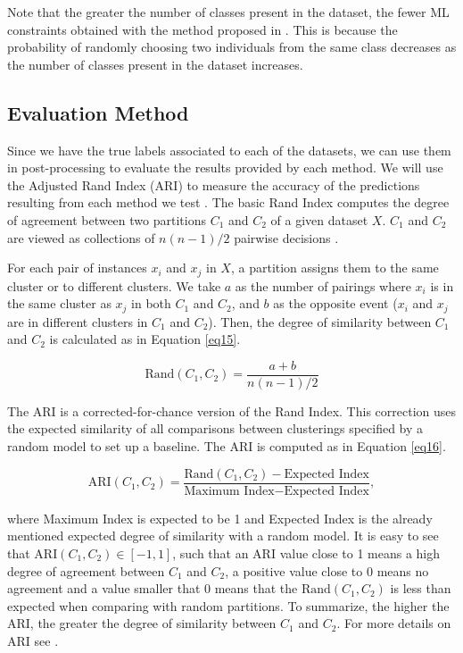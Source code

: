 \documentclass[review]{elsarticle}
\begin{document}
Note that the greater the number of classes present in the dataset, the fewer ML constraints obtained with the method proposed in \cite{wagstaff2001constrained}. This is because the probability of randomly choosing two individuals from the same class decreases as the number of classes present in the dataset increases.

\clearpage

\subsection{Evaluation Method} \label{sec:EvalMet}

Since we have the true labels associated to each of the datasets, we can use them in post-processing to evaluate the results provided by each method. We will use the Adjusted Rand Index (ARI) to measure the accuracy of the predictions resulting from each method we test \cite{hubert1985comparing}. The basic Rand Index computes the degree of agreement between two partitions $C_1$ and $C_2$ of a given dataset $X$. $C_1$ and $C_2$ are viewed as collections of $n(n - 1)/2$ pairwise decisions \cite{rand1971objective}.

For each pair of instances $x_i$ and $x_j$ in $X$, a partition assigns them to the same cluster or to different clusters. We take $a$ as the number of pairings where $x_i$ is in the same cluster as $x_j$ in both $C_1$ and $C_2$, and $b$ as the opposite event ($x_i$ and $x_j$ are in different clusters in $C_1$ and $C_2$). Then, the degree of similarity between $C_1$ and $C_2$ is calculated as in Equation \eqref{eq15}.

\begin{equation}
\text{Rand}(C_1, C_2) = \frac{a + b}{n(n - 1)/2}
\label{eq15}
\end{equation}

The ARI is a corrected-for-chance version of the Rand Index. This correction uses the expected similarity of all comparisons between clusterings specified by a random model to set up a baseline. The ARI is computed as in Equation \eqref{eq16}.

\begin{equation}
\text{ARI}(C_1, C_2) = \frac{\text{Rand}(C_1, C_2) - \text{Expected Index}}{\text{Maximum Index} - \text{Expected Index}},
\label{eq16}
\end{equation}

\noindent where Maximum Index is expected to be 1 and Expected Index is the already mentioned expected degree of similarity with a random model. It is easy to see that $\text{ARI}(C_1, C_2) \in [-1,1]$, such that an ARI value close to 1 means a high degree of agreement between $C_1$ and $C_2$, a positive value close to 0 means no agreement and a value smaller that 0 means that the $\text{Rand}(C_1, C_2)$ is less than expected when comparing with random partitions. To summarize, the higher the ARI, the greater the degree of similarity between $C_1$ and $C_2$. For more details on ARI see \cite{hubert1985comparing}.
\end{document}
